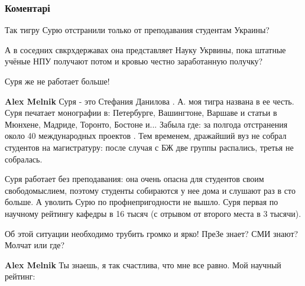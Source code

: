 
 
 
 
 
\subsubsection{Коментарі}
\label{sec:03_07_2021.fb.bilchenko_evgenia.4.ekaterinburg_konferencia.cmt}

\begin{itemize}
Так тигру Сурю отстранили только от преподавания студентам Украины?

А в соседних свкрхдержавах она представляет Науку Укрвины, пока штатные учёные
НПУ получают потом и кровью честно заработанную получку?

Суря же не работает больше!

\begin{itemize}
\textbf{Alex Melnik} Суря - это Стефания Данилова . А. моя тигра названа в ее честь. Суря печатает монографии в: Петербурге, Вашингтоне, Варшаве и статьи в Мюнхене, Мадриде, Торонто, Бостоне и... Забыла где: за полгода отстранения около 40 международных проектов . Тем временем, дражайший вуз не собрал студентов на магистратуру: после случая с БЖ две группы распались, третья не собралась.

Суря работает без преподавания: она очень опасна для студентов своим свободомыслием, поэтому студенты собираются у нее дома и слушают раз в сто больше. А уволить Сурю по профнепригодности не вышло. Суря первая по научному рейтингу кафедры в 16 тысяч (с отрывом от второго места в 3 тысячи).

Об этой ситуации необходимо трубить громко и ярко!
ПреЗе знает?
СМИ знают?
Молчат или где?

\textbf{Alex Melnik} Ты знаешь, я так счастлива, что мне все равно. Мой научный рейтинг:


\end{itemize}
\end{itemize}
